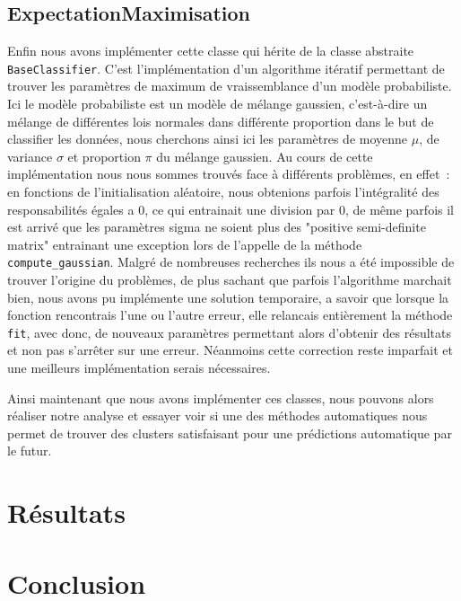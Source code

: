 \documentclass{NewTeX}
\begin{document}
    \subsection{ExpectationMaximisation}\label{subsec:expectationmaximisation}
    Enfin nous avons implémenter cette classe qui hérite de la classe abstraite \verb|BaseClassifier|.
    C'est l'implémentation d'un algorithme itératif permettant de trouver les paramètres de maximum de vraissemblance d'un modèle probabiliste.
    Ici le modèle probabiliste est un modèle de mélange gaussien, c'est-à-dire un mélange de différentes lois normales dans différente proportion dans le but de classifier les données, nous cherchons ainsi ici les paramètres de moyenne $\mu$, de variance $\sigma$ et proportion $\pi$ du mélange gaussien.
    Au cours de cette implémentation nous nous sommes trouvés face à différents problèmes, en effet : en fonctions de l'initialisation aléatoire, nous obtenions parfois l'intégralité des responsabilités égales a 0, ce qui entrainait une division par 0, de même parfois il est arrivé que les paramètres sigma ne soient plus des "positive semi-definite matrix" entrainant une exception lors de l'appelle de la méthode \verb|compute_gaussian|.
Malgré de nombreuses recherches ils nous a été impossible de trouver l'origine du problèmes, de plus sachant que parfois l'algorithme marchait bien, nous avons pu implémente une solution temporaire, a savoir que lorsque la fonction rencontrais l'une ou l'autre erreur, elle relancais entièrement la méthode \verb|fit|, avec donc, de nouveaux paramètres permettant alors d'obtenir des résultats et non pas s'arrêter sur une erreur. Néanmoins cette correction reste imparfait et une meilleurs implémentation serais nécessaires.


Ainsi maintenant que nous avons implémenter ces classes, nous pouvons alors réaliser notre analyse et essayer voir si une des méthodes automatiques nous permet de trouver des clusters satisfaisant pour une prédictions automatique par le futur.

\section{Résultats}\label{sec:resultats}




\section{Conclusion}\label{sec:conclusion}
\end{document}
